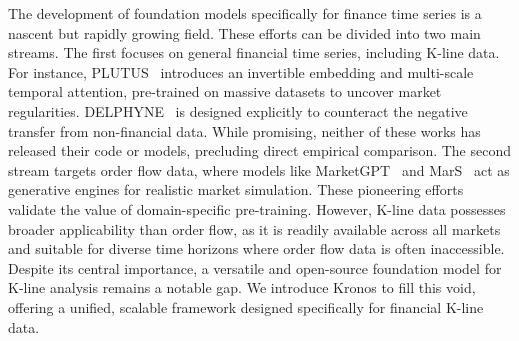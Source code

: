 The development of foundation models specifically for finance time series is a nascent but rapidly growing field. These efforts can be divided into two main streams. The first focuses on general financial time series, including K-line data. For instance, PLUTUS~\cite{xu2024plutus} introduces an invertible embedding and multi-scale temporal attention, pre-trained on massive datasets to uncover market regularities. DELPHYNE~\cite{ding2025delphyne} is designed explicitly to counteract the negative transfer from non-financial data. While promising, neither of these works has released their code or models, precluding direct empirical comparison. The second stream targets order flow data, where models like MarketGPT~\cite{wheeler2024marketgpt} and MarS~\cite{li2024mars} act as generative engines for realistic market simulation. These pioneering efforts validate the value of domain-specific pre-training. However, K-line data possesses broader applicability than order flow, as it is readily available across all markets and suitable for diverse time horizons where order flow data is often inaccessible. Despite its central importance, a versatile and open-source foundation model for K-line analysis remains a notable gap. We introduce Kronos to fill this void, offering a unified, scalable framework designed specifically for financial K-line data.

